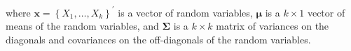 \noindent where
$\mathbf{x} = \left\{ X_1, \dots, X_k \right\}^{\prime}$
is a vector of random variables,
$\boldsymbol{\mu}$ is a $k \times 1$
vector of means of the random variables,
and
$\boldsymbol{\Sigma}$ is a $k \times k$
matrix of variances on the diagonals
and covariances on the off-diagonals
of the random variables.
